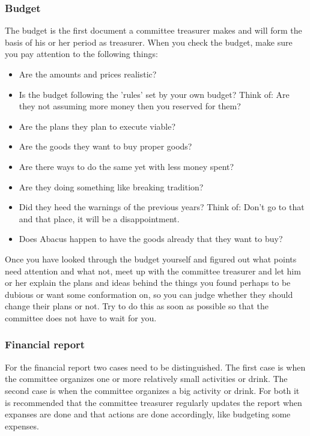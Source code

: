 \documentclass{report}
\begin{document}
\subsubsection{Budget}
The budget is the first document a committee treasurer makes and will form the basis of his or her period as treasurer. When you check the budget, make sure you pay attention to the following things: 
\begin{itemize}
\vspace{-1mm}
\itemsep-1mm 
\item Are the amounts and prices realistic?
\item Is the budget following the 'rules' set by your own budget? Think of: Are they not assuming more money then you reserved for them?
\item Are the plans they plan to execute viable?
\item Are the goods they want to buy proper goods?
\item Are there ways to do the same yet with less money spent?
\item Are they doing something like breaking tradition?
\item Did they heed the warnings of the previous years? Think of: Don't go to that and that place, it will be a disappointment.
\item Does Abacus happen to have the goods already that they want to buy?
\end{itemize}
Once you have looked through the budget yourself and figured out what points need attention and what not, meet up with the committee treasurer and let him or her explain the plans and ideas behind the things you found perhaps to be dubious or want some conformation on, so you can judge whether they should change their plans or not. Try to do this as soon as possible so that the committee does not have to wait for you. 

\subsubsection{Financial report}
For the financial report two cases need to be distinguished. The first case is when the committee organizes one or more relatively small activities or drink. The second case is when the committee organizes a big activity or drink. For both it is recommended that the committee treasurer regularly updates the report when expanses are done and that actions are done accordingly, like budgeting some expenses. 
\end{document}
